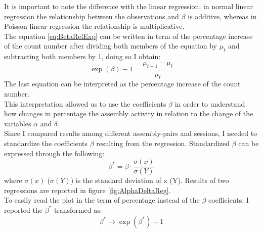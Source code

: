 It is important to note the difference with the linear regression: in normal linear regression the relationship between the observations and $\beta$ is additive, whereas in Poisson linear regression the relationship is multiplicative.\\The equation \ref{eq:BetaRelExp} can be written in term of the percentage increase of the count number after dividing both members of the equation by $\mu_t$ and subtracting both members by 1, doing so I obtain:
\begin{equation}
\exp(\beta)-1=\frac{\mu_{t+1}-\mu_t}{\mu_t}
    \label{eq:BetaPerc}
\end{equation}
The last equation can be interpreted as the percentage increase of the count number.\\This interpretation allowed us to use the coefficients $\beta$ in order to understand how changes in percentage the assembly activity in relation to the change of the variables $\alpha$ and $\delta$.\\Since I compared results among different assembly-pairs and sessions, I needed to standardize the coefficients $\beta$ resulting from the regression. Standardized $\beta$ can be expressed through the following:
\begin{equation}
    \beta^*=\beta\cdot\frac{\sigma(x)}{\sigma(Y)}
    \label{eq:betaStand}
\end{equation}
where $\sigma(x)$ ($\sigma(Y)$) is the standard deviation of x (Y).
Results of two regressions are reported in figure \ref{fig:AlphaDeltaReg}.\\
To easily read the plot in the term of percentage instead of the $\beta$ coefficients, I reported the $\beta^*$ transformed as:
\begin{equation}
    \beta^*\rightarrow \exp(\beta^*)-1
    \label{eq:BetaPlot}
\end{equation}

